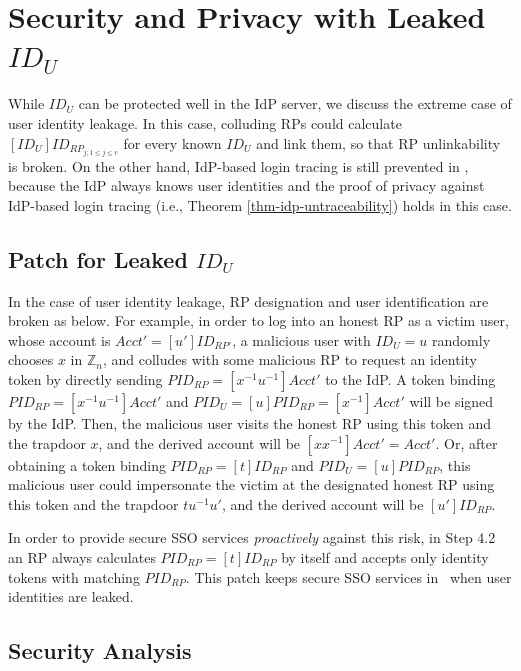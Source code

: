 \appendix

\section{Security and Privacy with Leaked $ID_U$}
\label{sp-leak-uid}
While $ID_U$ can be protected well in the IdP server, 
    we discuss the extreme case of user identity leakage.
In this case,
    colluding RPs could calculate $[ID_U]ID_{RP_{j;1\leq j \leq c}}$ for every known $ID_U$ and link them,
so that RP unlinkability is broken.
On the other hand, IdP-based login tracing is still prevented in \usso,
    because the IdP always knows user identities and the proof of privacy against IdP-based login tracing (i.e., Theorem \ref{thm-idp-untraceability}) holds in this case.

\subsection{Patch for Leaked $ID_U$}
In the case of user identity leakage,
RP designation and user identification are broken as below.
For example, in order to log into an honest RP as a victim user, whose account is $Acct' = [u']ID_{RP'}$,
    a malicious user with $ID_U = u$ randomly chooses $x$ in $\mathbb{Z}_n$,
    and colludes with some malicious RP to request an identity token by directly sending $PID_{RP} = [x^{-1}u^{-1}]Acct'$ to the IdP.
A token binding $PID_{RP} = [x^{-1}u^{-1}]Acct'$ and $PID_U = [u]PID_{RP} = [x^{-1}]Acct'$ will be signed by the IdP.
Then, the malicious user visits the honest RP using this token and the trapdoor $x$,
    and the derived account will be $[xx^{-1}]Acct'=Acct'$.
Or, after obtaining a token binding $PID_{RP} = [t]ID_{RP}$ and $PID_U = [u]PID_{RP}$,
    this malicious user could impersonate the victim at the designated honest RP
     using this token and the trapdoor $tu^{-1}u'$, and the derived account will be $[u']ID_{RP}$.

In order to provide secure SSO services \emph{proactively} against this risk,
     in Step 4.2 an RP always calculates $PID_{RP} = [t]ID_{RP}$ by itself and
        accepts only identity tokens with matching $PID_{RP}$.
This patch keeps secure SSO services in \usso\ when user identities are leaked.

\subsection{Security Analysis}
\label{proof-rp-collision}


